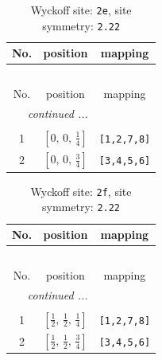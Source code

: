 \documentclass[fleqn,8pt]{jsarticle}
\begin{document}
\begin{longtable}{ccc}
\caption{Wyckoff site: {\tt 2e}, site symmetry: {\tt 2.22}}
 \\
 \hline \hline
No. & position & mapping \\ \hline \endfirsthead

\multicolumn{2}{l}{\tablename\ \thetable{}} \\
 \hline \hline
No. & position & mapping \\ \hline \endhead

 \hline \hline
\multicolumn{2}{r}{\footnotesize\it continued ...} \\ \endfoot

 \hline \hline
\multicolumn{2}{r}{} \\ \endlastfoot

1 & $\left[ 0,\, 0,\, \frac{1}{4} \right]$ & {\tt [1,2,7,8]} \\ \hline
2 & $\left[ 0,\, 0,\, \frac{3}{4} \right]$ & {\tt [3,4,5,6]} \\
\end{longtable}
\renewcommand{\arraystretch}{1.2}
\begin{longtable}{ccc}
\caption{Wyckoff site: {\tt 2f}, site symmetry: {\tt 2.22}}
 \\
 \hline \hline
No. & position & mapping \\ \hline \endfirsthead

\multicolumn{2}{l}{\tablename\ \thetable{}} \\
 \hline \hline
No. & position & mapping \\ \hline \endhead

 \hline \hline
\multicolumn{2}{r}{\footnotesize\it continued ...} \\ \endfoot

 \hline \hline
\multicolumn{2}{r}{} \\ \endlastfoot

1 & $\left[ \frac{1}{2},\, \frac{1}{2},\, \frac{1}{4} \right]$ & {\tt [1,2,7,8]} \\ \hline
2 & $\left[ \frac{1}{2},\, \frac{1}{2},\, \frac{3}{4} \right]$ & {\tt [3,4,5,6]} \\
\end{longtable}
\renewcommand{\arraystretch}{1.2}
\end{document}
